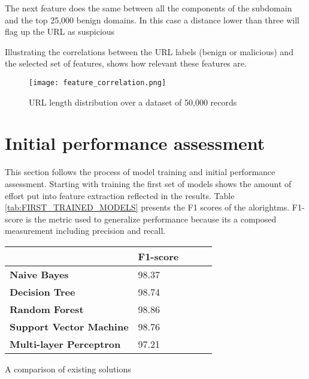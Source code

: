 The next feature does the same between all the components of the subdomain and the top 25,000 benign domains. In this case a distance lower than three will flag up the URL as suspicious

Illustrating the correlations between the URL labels (benign or malicious) and the selected set of features, shows how relevant these features are.

\begin{figure}[t]
	\centering
	\texttt{[image: feature\_correlation.png]}
	\caption{URL length distribution over a dataset of 50,000 records}
	\label{fig:FEATURE_CORRELATION}
\end{figure}

\section{Initial performance assessment}
This section follows the process of model training and initial performance assessment. Starting with training the first set of models shows the amount of effort put into feature extraction reflected in the results. Table \ref{tab:FIRST_TRAINED_MODELS} presents the F1 scores of the alorightms. F1-score is the metric used to generalize performance because its a composed measurement including precision and recall.

\begin{singlespace}
	\small
	\begin{center}
		\label{tab:FIRST_TRAINED_MODELS}
		\begin{tabular}{ | m{8em} | m{13em} | m{8.5em} | m{2.3em} | m{5em} | }
			\hline
			                                & \textbf{F1-score} \\
			\hline
			\textbf{Naive Bayes}            & 98.37             \\
			\hline
			\textbf{Decision Tree}          & 98.74             \\
			\hline
			\textbf{Random Forest}          & 98.86             \\
			\hline
			\textbf{Support Vector Machine} & 98.76             \\
			\hline
			\textbf{Multi-layer Perceptron} & 97.21             \\
			\hline
		\end{tabular}
		\captionsetup{type=table}\caption{A comparison of existing solutions \citep{INTELLIGENT_PHISHING_ANFIS}}
	\end{center}
\end{singlespace}

